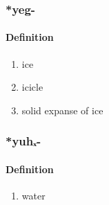 \subsubsection{\**yeg-}
\paragraph{Definition}
\begin{enumerate}
\item ice
\item icicle
\item solid expanse of ice
\end{enumerate}
\subsubsection{\**yuhₓ-}
\paragraph{Definition}
\begin{enumerate}
\item water
\end{enumerate}
